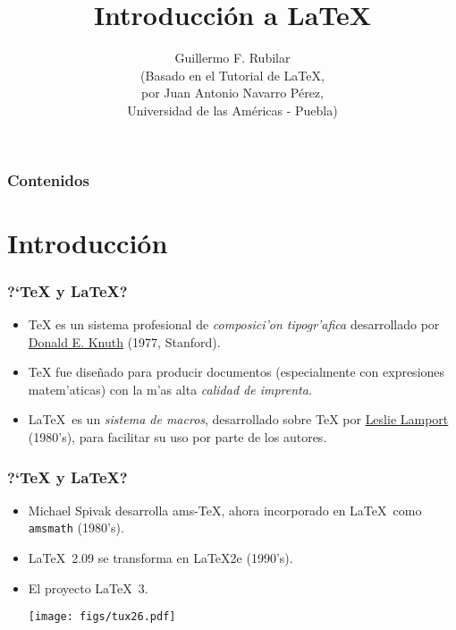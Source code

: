 \documentclass[hyperref={colorlinks}]{beamer}
\begin{document}
\title[\LaTeX]{Introducci\'on a \LaTeX}
\author[G.R.]{{Guillermo F. Rubilar} \\ \tiny (Basado en el Tutorial de \LaTeX ,\\
por Juan Antonio Navarro P\'{e}rez, \\Universidad de las Am\'{e}ricas - Puebla)}
\frame{\titlepage}


\begin{frame}
\frametitle{Contenidos}
\tableofcontents
\end{frame}


\section{Introducci\'on}
\begin{frame}[fragile]\frametitle{?`\TeX{} y \LaTeX?}
\begin{itemize}
\item \TeX{} es un sistema profesional de \emph{composici'on tipogr'afica} desarrollado
por \href{http://www-cs-faculty.stanford.edu/~knuth}{Donald E. Knuth} (1977, Stanford).
\item \TeX{} fue dise\~nado para producir documentos (especialmente con expresiones matem'aticas) con la m'as alta \emph{calidad de imprenta}.
\item \LaTeX\ es un \emph{sistema de macros}, desarrollado sobre \TeX{} por \href{https://es.wikipedia.org/wiki/Leslie_Lamport}{Leslie Lamport} (1980's), para facilitar su uso por parte de los autores.
\end{itemize}
\end{frame}

\begin{frame}[fragile]\frametitle{?`\TeX{} y \LaTeX?}
\begin{itemize}
\item Michael Spivak desarrolla ams-TeX, ahora incorporado en \LaTeX\ como \texttt{amsmath} 
(1980's).
  \item \LaTeX\ 2.09 se transforma en \LaTeX2e (1990's).
  \item El proyecto \LaTeX\ 3. 
	\begin{center}
		\texttt{[image: figs/tux26.pdf]}
	\end{center}
\end{itemize}
\end{frame}


\end{document}
